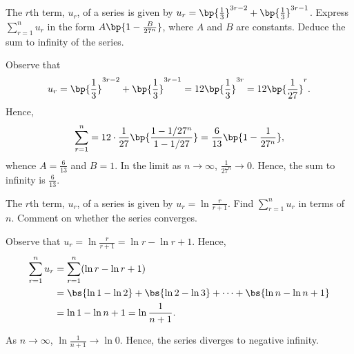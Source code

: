 \begin{problem}
    The $r$th term, $u_r$, of a series is given by $u_r = \bp{\frac13}^{3r-2} + \bp{\frac13}^{3r-1}$. Express $\sum_{r=1}^n u_r$ in the form $A\bp{1 - \frac{B}{27^n}}$, where $A$ and $B$ are constants. Deduce the sum to infinity of the series.
\end{problem}
\begin{solution}
    Observe that \[u_r = \bp{\frac13}^{3r-2} + \bp{\frac13}^{3r-1} = 12 \bp{\frac13}^{3r} = 12 \bp{\frac1{27}}^r.\] Hence, \[\sum_{r = 1}^n = 12 \cdot \frac1{27}\bp{\frac{1 - 1/27^n}{1 - 1/27}} = \frac{6}{13} \bp{1 - \frac1{27^n}},\] whence $A = \frac6{13}$ and $B = 1$. In the limit as $n \to \infty$, $\frac1{27^n} \to 0$. Hence, the sum to infinity is $\frac{6}{13}$.
\end{solution}

\begin{problem}
    The $r$th term, $u_r$, of a series is given by $u_r = \ln \frac{r}{r+1}$. Find $\sum_{r=1}^n u_r$ in terms of $n$. Comment on whether the series converges.
\end{problem}
\begin{solution}
    Observe that $u_r = \ln \frac{r}{r+1} = \ln r - \ln{r+1}$. Hence,
    \begin{align*}
        \sum_{r=1}^n u_r &= \sum_{r=1}^n (\ln r - \ln{r+1})\\
        &= \bs{\ln 1 - \ln 2} + \bs{\ln 2 - \ln 3} + \cdots + \bs{\ln n - \ln{n+1}}\\
        &= \ln 1 - \ln{n+1} = \ln \frac1{n+1}.
    \end{align*}

    As $n \to \infty$, $\ln \frac1{n+1} \to \ln 0$. Hence, the series diverges to negative infinity.
\end{solution}

